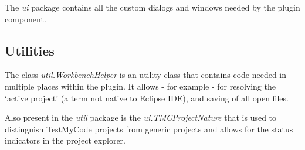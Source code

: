 \documentclass[12pt,a4paper,english,leqno]{article}
\begin{document}
The \textit{ui} package contains all the custom dialogs and windows needed by the plugin component.

\subsection{Utilities}

The class \textit{util.WorkbenchHelper} is an utility class that contains code needed in multiple places within the plugin. It allows - for example - for resolving the `active project' (a term not native to Eclipse IDE), and saving of all open files.

Also present in the \textit{util} package is the \textit {ui.TMCProjectNature} that is used to distinguish TestMyCode projects from generic projects and allows for the status indicators in the project explorer.
\end{document}
